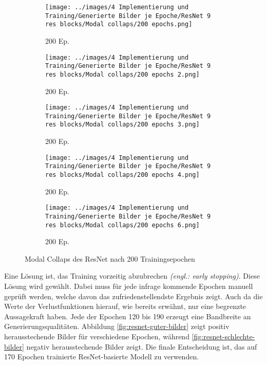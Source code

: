 \begin{figure}[htpb]
    \centering
    \begin{subfigure}[b]{0.12\textwidth}
        \centering
        \texttt{[image: ../images/4 Implementierung und Training/Generierte Bilder je Epoche/ResNet 9 res blocks/Modal collaps/200 epochs.png]}
        \caption{200 Ep.\protect\footnotemark}
    \end{subfigure}
    \hspace{3em}%
    \begin{subfigure}[b]{0.12\textwidth}
        \centering
        \texttt{[image: ../images/4 Implementierung und Training/Generierte Bilder je Epoche/ResNet 9 res blocks/Modal collaps/200 epochs 2.png]}
        \caption{200 Ep.}
    \end{subfigure}
    \hspace{3em}%
    \begin{subfigure}[b]{0.12\textwidth}
        \centering
        \texttt{[image: ../images/4 Implementierung und Training/Generierte Bilder je Epoche/ResNet 9 res blocks/Modal collaps/200 epochs 3.png]}
        \caption{200 Ep.}
    \end{subfigure}
    \hspace{3em}%
    \begin{subfigure}[b]{0.12\textwidth}
        \centering
        \texttt{[image: ../images/4 Implementierung und Training/Generierte Bilder je Epoche/ResNet 9 res blocks/Modal collaps/200 epochs 4.png]}
        \caption{200 Ep.}
    \end{subfigure}
    \hspace{3em}%
    \begin{subfigure}[b]{0.12\textwidth}
    \centering
    \texttt{[image: ../images/4 Implementierung und Training/Generierte Bilder je Epoche/ResNet 9 res blocks/Modal collaps/200 epochs 6.png]}
    \caption{200 Ep.}
\end{subfigure}
        \caption{Modal Collaps des ResNet nach 200 Trainingsepochen}
        \label{fig:modal-collaps}
\end{figure}

Eine Lösung ist, das Training vorzeitig abzubrechen \emph{(engl.: early stopping)}. Diese Lösung wird gewählt. Dabei muss für jede infrage kommende Epochen manuell geprüft werden, welche davon das zufriedenstellendste Ergebnis zeigt. Auch da die Werte der Verlustfunktionen hierauf, wie bereits erwähnt, nur eine begrenzte Aussagekraft haben. Jede der Epochen 120 bis 190 erzeugt eine Bandbreite an Generierungsqualitäten. Abbildung \ref{fig:resnet-guter-bilder} zeigt positiv herausstechende Bilder für verschiedene Epochen, während \ref{fig:resnet-schlechte-bilder} negativ herausstechende Bilder zeigt. Die finale Entscheidung ist, das auf 170 Epochen trainierte ResNet-basierte Modell zu verwenden.

